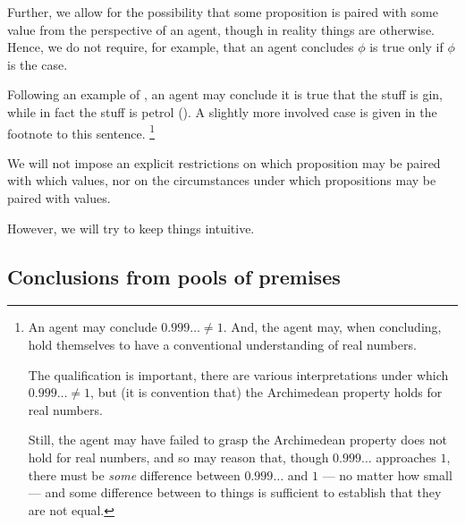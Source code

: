 \begin{note}
  Further, we allow for the possibility that some proposition is paired with some value from the perspective of an agent, though in reality things are otherwise.
  Hence, we do not require, for example, that an agent concludes \(\phi\) is true only if \(\phi\) is the case.

  Following an example of \citeauthor{Williams:1979wi}, an agent may conclude it is true that the stuff is gin, while in fact the stuff is petrol (\citeyear[18]{Williams:1979wi}).
  A slightly more involved case is given in the footnote to this sentence.%
  \footnote{
    An agent may conclude \(0.999\dots \ne 1\).
    And, the agent may, when concluding, hold themselves to have a conventional understanding of real numbers.

    The qualification is important, there are various interpretations under which \(0.999\dots \ne 1\), but (it is convention that) the Archimedean property holds for real numbers.

    Still, the agent may have failed to grasp the Archimedean property does not hold for real numbers, and so may reason that, though \(0.999\dots\) approaches \(1\), there must be \emph{some} difference between \(0.999\dots\) and \(1\) --- no matter how small --- and some difference between to things is sufficient to establish that they are not equal.
  }
\end{note}

\begin{note}
  We will not impose an explicit restrictions on which proposition may be paired with which values, nor on the circumstances under which propositions may be paired with values.

  However, we will try to keep things intuitive.
\end{note}

\subsection{Conclusions from pools of premises}
\label{sec:pools-premises}

